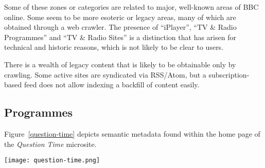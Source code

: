 Some of these zones or categories are related to major, well-known areas of
BBC online. Some seem to be more esoteric or legacy areas, many of which
are obtained through a web crawler. The presence of ``iPlayer'',
``TV \& Radio Programmes'' and ``TV \& Radio Sites'' is a distinction that
has arisen for technical and historic reasons, which is not likely to be
clear to users.

There is a wealth of legacy content that is likely to be obtainable only by
crawling. Some active sites are syndicated via RSS/Atom, but a subscription-based
feed does not allow indexing a backfill of content easily.

\subsection{Programmes}

Figure~\ref{question-time} depicts semantic metadata found within the home page
of the \emph{Question Time} microsite.

\begin{sidewaysfigure}
  \begin{center}
    \texttt{[image: question-time.png]}
  \end{center}
  \caption{Semantic metadata found within \emph{Question Time} home page}
  \label{question-time}
\end{sidewaysfigure}


